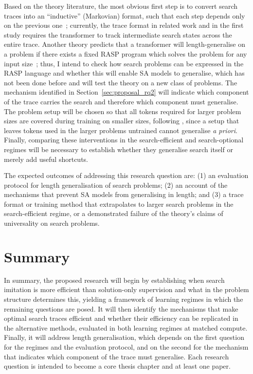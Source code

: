 Based on the theory literature, the most obvious first step is to convert search traces into an ``inductive'' (Markovian) format, such that each step depends only on the previous one~\citep{houUniversalLengthGeneralization2024,abbeHowFarCan2024}; currently, the trace format in related work and in the first study requires the transformer to track intermediate search states across the entire trace.
Another theory predicts that a transformer will length-generalise on a problem if there exists a fixed RASP program which solves the problem for any input size~\citep{zhouWhatAlgorithmsCan2023,weissThinkingTransformers2021}; thus, I intend to check how search problems can be expressed in the RASP language and whether this will enable SA models to generalise, which has not been done before and will test the theory on a new class of problems.
The mechanism identified in Section~\ref{sec:proposal_rq2} will indicate which component of the trace carries the search and therefore which component must generalise.
The problem setup will be chosen so that all tokens required for larger problem sizes are covered during training on smaller sizes, following \citet{caiExtrapolationAssociationLength2025}, since a setup that leaves tokens used in the larger problems untrained cannot generalise \textit{a priori}.
Finally, comparing these interventions in the search-efficient and search-optional regimes will be necessary to establish whether they generalise search itself or merely add useful shortcuts.

The expected outcomes of addressing this research question are: (1) an evaluation protocol for length generalisation of search problems; (2) an account of the mechanisms that prevent SA models from generalising in length; and (3) a trace format or training method that extrapolates to larger search problems in the search-efficient regime, or a demonstrated failure of the theory's claims of universality on search problems.

\section{Summary}
\label{sec:proposal_summary}

In summary, the proposed research will begin by establishing when search imitation is more efficient than solution-only supervision and what in the problem structure determines this, yielding a framework of learning regimes in which the remaining questions are posed.
It will then identify the mechanisms that make optimal search traces efficient and whether their efficiency can be replicated in the alternative methods, evaluated in both learning regimes at matched compute.
Finally, it will address length generalisation, which depends on the first question for the regimes and the evaluation protocol, and on the second for the mechanism that indicates which component of the trace must generalise.
Each research question is intended to become a core thesis chapter and at least one paper.

